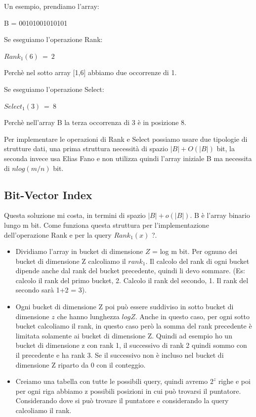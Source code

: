 \documentclass[14pt]{extreport}
\begin{document}
Un esempio, prendiamo l'array:
\newline
\centerline{B = 00101001010101}
Se eseguiamo l'operazione Rank:
\newline
\centerline{$Rank_1(6) \ = \ 2$}
Perchè nel sotto array [1,6] abbiamo due occorrenze di 1.

Se eseguiamo l'operazione Select:
\newline
\centerline{$Select_1(3) \ = \ 8$}
Perchè nell'array B la terza occorrenza di 3 è in posizione 8.

Per implementare le operazioni di Rank e Select possiamo usare due tipologie di strutture dati, una prima struttura necessità di spazio $|B| + O(|B|)$ bit, la seconda invece usa Elias Fano e non utilizza quindi l'array iniziale B ma necessita di $nlog(m/n)$ bit.

\subsection{Bit-Vector Index}
Questa soluzione mi costa, in termini di spazio $|B| + o(|B|)$.
B è l'array binario lungo m bit.
Come funziona questa struttura per l'implementazione dell'operazione Rank e per la query $Rank_1(x)$ ?.
\begin{itemize}
    \item Dividiamo l'array in bucket di dimensione $Z$ = log m bit.
    Per ognuno dei bucket di dimensione Z calcoliamo il $rank_1$.
    Il calcolo del rank di ogni bucket dipende anche dal rank del bucket precedente, quindi li devo sommare. (Es: calcolo il rank del primo bucket, 2. Calcolo il rank del secondo, 1. Il rank del secondo sarà 1+2 = 3).
    \item Ogni bucket di dimensione Z poi può essere suddiviso in sotto bucket di dimensione $z$ che hanno lunghezza $log Z$. Anche in questo caso, per ogni sotto bucket calcoliamo il rank, in questo caso però la somma del rank precedente è limitata solamente ai bucket di dimensione Z. Quindi ad esempio ho un bucket di dimensione z con rank 1, il successivo di rank 2 quindi sommo con il precedente e ha rank 3. Se il successivo non è incluso nel bucket di dimensione Z riparto da 0 con il conteggio.
    \item Creiamo una tabella con tutte le possibili query, quindi avremo $2^z$ righe e poi per ogni riga abbiamo z possibili posizioni in cui può trovarsi il puntatore. Considerando dove si può trovare il puntatore e considerando la query calcoliamo il rank.
\end{itemize}
\end{document}
